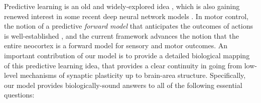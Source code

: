 \documentclass[11pt,twoside]{article}
\newif\myifpdf
\begin{document}
Predictive learning is an old and widely-explored idea \cite{Elman90,Elman91,Jordan89,SchusterPaliwal97,HawkinsBlakeslee04,GeorgeHawkins09}, which is also gaining renewed interest in some recent deep neural network models \cite{LotterKreimanCox16}.  In motor control, the notion of a predictive {\em forward model} that anticipates the outcomes of actions is well-established \cite{KawatoFurukawaSuzuki87,JordanRumelhart92,MiallWolpert96}, and the current framework advances the notion that the entire neocortex is a forward model for sensory and motor outcomes.  An important contribution of our model is to provide a detailed biological mapping of this predictive learning idea, that provides a clear continuity in going from low-level mechanisms of synaptic plasticity up to brain-area structure.  Specifically, our model provides biologically-sound answers to all of the following essential questions:
\end{document}
